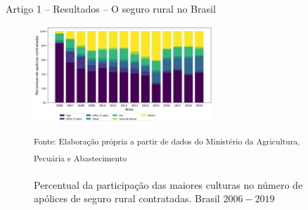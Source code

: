 \documentclass[aspectratio=169]{beamer}
\begin{document}
\begin{frame}{Artigo 1 -- Resultados -- O seguro rural no Brasil}
	\begin{figure}
		\centering
		\includegraphics[width=0.6\textwidth]{img/percent_apolic_cult.png}
		\caption{Percentual da participação das maiores culturas no número de apólices de seguro rural contratadas. Brasil $2006 - 2019$}
		\small \textsuperscript {Fonte: Elaboração própria a partir de dados do Ministério da Agricultura, Pecuária e Abastecimento}
	\end{figure}
\end{frame}
\end{document}
